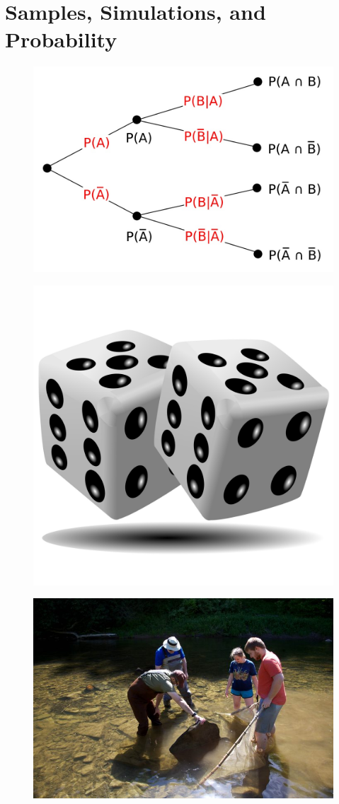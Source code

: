 \documentclass[
]{book}
\theoremstyle{definition}
\theoremstyle{definition}
\theoremstyle{definition}
\theoremstyle{definition}
\theoremstyle{remark}
\begin{document}
\hypertarget{ch:simulations}{%
\chapter{Samples, Simulations, and Probability}\label{ch:simulations}}

\begin{figure}

{\centering \includegraphics[width=0.6\linewidth]{images/Probability_tree_diagram} 

}

\end{figure}

\begin{figure}

{\centering \includegraphics[width=0.2\linewidth]{images/dice-1509741828tXY} 

}

\end{figure}

\begin{figure}

{\centering \includegraphics[width=0.5\linewidth]{images/PIXNIO-54228-725x483} 

}

\end{figure}
\end{document}
